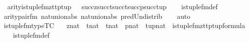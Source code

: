 \begin{isabellebody}
\ \ arity{\isacharparenleft}{\kern0pt}is{\isacharunderscore}{\kern0pt}tuple{\isacharunderscore}{\kern0pt}fm{\isacharparenleft}{\kern0pt}z{\isacharcomma}{\kern0pt}t{}{\isacharcomma}{\kern0pt}t{}{\isacharcomma}{\kern0pt}p{\isacharcomma}{\kern0pt}tup{\isacharparenright}{\kern0pt}{\isacharparenright}{\kern0pt}\ {\isacharequal}{\kern0pt}\ {\isasymUnion}\ {\isacharbraceleft}{\kern0pt}succ{\isacharparenleft}{\kern0pt}z{\isacharparenright}{\kern0pt}{\isacharcomma}{\kern0pt}succ{\isacharparenleft}{\kern0pt}t{}{\isacharparenright}{\kern0pt}{\isacharcomma}{\kern0pt}succ{\isacharparenleft}{\kern0pt}t{}{\isacharparenright}{\kern0pt}{\isacharcomma}{\kern0pt}succ{\isacharparenleft}{\kern0pt}p{\isacharparenright}{\kern0pt}{\isacharcomma}{\kern0pt}succ{\isacharparenleft}{\kern0pt}tup{\isacharparenright}{\kern0pt}{\isacharbraceright}{\kern0pt}{\isachardoublequoteclose}\isanewline
%
\isadelimproof
\ \ %
\endisadelimproof
%
\isatagproof
{}\isamarkupfalse%
\ is{\isacharunderscore}{\kern0pt}tuple{\isacharunderscore}{\kern0pt}fm{\isacharunderscore}{\kern0pt}def\isanewline
\ \ \isamarkupfalse%
\ arity{\isacharunderscore}{\kern0pt}pair{\isacharunderscore}{\kern0pt}fm\ nat{\isacharunderscore}{\kern0pt}union{\isacharunderscore}{\kern0pt}abs{}\ nat{\isacharunderscore}{\kern0pt}union{\isacharunderscore}{\kern0pt}abs{}\ pred{\isacharunderscore}{\kern0pt}Un{\isacharunderscore}{\kern0pt}distrib\isanewline
\ \ \isamarkupfalse%
\ auto%
\endisatagproof
{\isafoldproof}%
%
\isadelimproof
\isanewline
%
\endisadelimproof
\isanewline
{}\isamarkupfalse%
\ is{\isacharunderscore}{\kern0pt}tuple{\isacharunderscore}{\kern0pt}fm{\isacharunderscore}{\kern0pt}type{\isacharbrackleft}{\kern0pt}TC{\isacharbrackright}{\kern0pt}\ {\isacharcolon}{\kern0pt}\isanewline
\ \ {\isachardoublequoteopen}z{\isasymin}nat\ {\isasymLongrightarrow}\ t{}{\isasymin}nat\ {\isasymLongrightarrow}\ t{}{\isasymin}nat\ {\isasymLongrightarrow}\ p{\isasymin}nat\ {\isasymLongrightarrow}\ tup{\isasymin}nat\ {\isasymLongrightarrow}\ is{\isacharunderscore}{\kern0pt}tuple{\isacharunderscore}{\kern0pt}fm{\isacharparenleft}{\kern0pt}z{\isacharcomma}{\kern0pt}t{}{\isacharcomma}{\kern0pt}t{}{\isacharcomma}{\kern0pt}p{\isacharcomma}{\kern0pt}tup{\isacharparenright}{\kern0pt}{\isasymin}formula{\isachardoublequoteclose}\isanewline
%
\isadelimproof
\ \ %
\endisadelimproof
%
\isatagproof
{}\isamarkupfalse%
\ is{\isacharunderscore}{\kern0pt}tuple{\isacharunderscore}{\kern0pt}fm{\isacharunderscore}{\kern0pt}def\ \isamarkupfalse%

\end{isabellebody}
